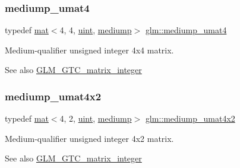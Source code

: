 \subsubsection{\texorpdfstring{mediump\+\_\+umat4}{mediump\_umat4}}
{\footnotesize\ttfamily typedef \mbox{\hyperlink{structglm_1_1mat}{mat}}$<$4, 4, \mbox{\hyperlink{group__core__precision_ga4fd29415871152bfb5abd588334147c8}{uint}}, \mbox{\hyperlink{namespaceglm_a36ed105b07c7746804d7fdc7cc90ff25a6416f3ea0c9025fb21ed50c4d6620482}{mediump}}$>$ \mbox{\hyperlink{group__gtc__matrix__integer_ga0653e9571754f1e33203290aaf3dfc5d}{glm\+::mediump\+\_\+umat4}}}

Medium-\/qualifier unsigned integer 4x4 matrix. \begin{DoxySeeAlso}{See also}
\mbox{\hyperlink{group__gtc__matrix__integer}{G\+L\+M\+\_\+\+G\+T\+C\+\_\+matrix\+\_\+integer}} 
\end{DoxySeeAlso}
\mbox{\label{group__gtc__matrix__integer_gaf44e145efd637df6f2a300f968ebb51f}} 
\subsubsection{\texorpdfstring{mediump\+\_\+umat4x2}{mediump\_umat4x2}}
{\footnotesize\ttfamily typedef \mbox{\hyperlink{structglm_1_1mat}{mat}}$<$4, 2, \mbox{\hyperlink{group__core__precision_ga4fd29415871152bfb5abd588334147c8}{uint}}, \mbox{\hyperlink{namespaceglm_a36ed105b07c7746804d7fdc7cc90ff25a6416f3ea0c9025fb21ed50c4d6620482}{mediump}}$>$ \mbox{\hyperlink{group__gtc__matrix__integer_gaf44e145efd637df6f2a300f968ebb51f}{glm\+::mediump\+\_\+umat4x2}}}

Medium-\/qualifier unsigned integer 4x2 matrix. \begin{DoxySeeAlso}{See also}
\mbox{\hyperlink{group__gtc__matrix__integer}{G\+L\+M\+\_\+\+G\+T\+C\+\_\+matrix\+\_\+integer}} 
\end{DoxySeeAlso}
\mbox{\label{group__gtc__matrix__integer_ga974bc32af0686378c4696208c3103d96}} 
